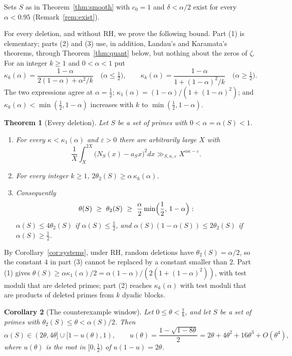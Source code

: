 \documentclass[11pt]{amsart}
\newtheorem{theorem}{Theorem}
\newtheorem{corollary}[theorem]{Corollary}
\theoremstyle{remark}
\numberwithin{equation}{section}
\newcommand{\eps}{\varepsilon}
\begin{document}
Sets $S$ as in Theorem~\ref{thm:smooth} with $c_0=1$ and $\delta<\alpha/2$ exist for every $\alpha<0.95$ (Remark~\ref{rem:exist}).

For every deletion, and without RH, we prove the following bound. Part (1) is elementary; parts (2) and (3) use, in addition, Landau's and Karamata's theorems, through Theorem~\ref{thm:quant} below, but nothing about the zeros of $\zeta$. For an integer $k\ge1$ and $0<\alpha<1$ put
\begin{equation}\label{eq:kappak}
\kappa_k(\alpha)=\frac{1-\alpha}{2(1-\alpha)+\alpha^2/k}\quad\bigl(\alpha\le\tfrac12\bigr),\qquad
\kappa_k(\alpha)=\frac{1-\alpha}{1+(1-\alpha)^2/k}\quad\bigl(\alpha\ge\tfrac12\bigr).
\end{equation}
The two expressions agree at $\alpha=\tfrac12$; $\kappa_1(\alpha)=(1-\alpha)/(1+(1-\alpha)^2)$; and $\kappa_k(\alpha)<\min(\tfrac12,1-\alpha)$ increases with $k$ to $\min(\tfrac12,1-\alpha)$.

\begin{theorem}[Every deletion]\label{thm:elementary}
Let $S$ be a set of primes with $0<\alpha=\alpha(S)<1$.
\begin{enumerate}
\item For every $\kappa<\kappa_1(\alpha)$ and $\eps>0$ there are arbitrarily large $X$ with
\[
\frac1X\int_X^{2X}\bigl(N_S(x)-a_Sx\bigr)^2dx\gg_{S,\kappa,\eps}X^{\alpha\kappa-\eps}.
\]
\item For every integer $k\ge1$, $2\theta_2(S)\ge\alpha\,\kappa_k(\alpha)$.
\item Consequently
\[
\theta(S)\ \ge\ \theta_2(S)\ \ge\ \frac{\alpha}{2}\min\Bigl(\frac12,\,1-\alpha\Bigr):
\]
$\alpha(S)\le4\theta_2(S)$ if $\alpha(S)\le\tfrac12$, and $\alpha(S)(1-\alpha(S))\le2\theta_2(S)$ if $\alpha(S)\ge\tfrac12$.
\end{enumerate}
\end{theorem}

By Corollary~\ref{cor:systems}, under RH, random deletions have $\theta_2(S)=\alpha/2$, so the constant $4$ in part (3) cannot be replaced by a constant smaller than $2$. Part (1) gives $\theta(S)\ge\alpha\kappa_1(\alpha)/2=\alpha(1-\alpha)/(2(1+(1-\alpha)^2))$, with test moduli that are deleted primes; part (2) reaches $\kappa_k(\alpha)$ with test moduli that are products of deleted primes from $k$ dyadic blocks.

\begin{corollary}[The counterexample window]\label{cor:window}
Let $0\le\theta<\tfrac18$, and let $S$ be a set of primes with $\theta_2(S)\le\theta<\alpha(S)/2$. Then
\[
\alpha(S)\in(2\theta,4\theta]\cup[1-u(\theta),1),\qquad u(\theta)=\frac{1-\sqrt{1-8\theta}}{2}=2\theta+4\theta^2+16\theta^3+O(\theta^4),
\]
where $u(\theta)$ is the root in $[0,\tfrac12)$ of $u(1-u)=2\theta$.
\end{corollary}
\end{document}
